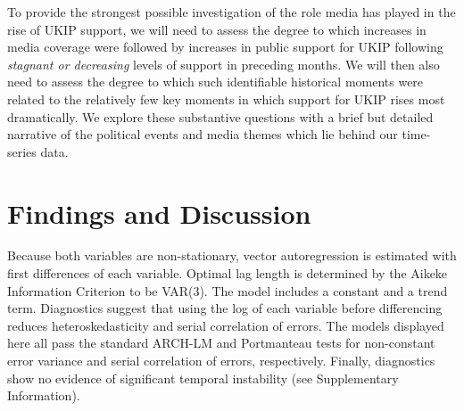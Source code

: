 \documentclass[12pt,article]{article}
\begin{document}
To provide the strongest possible investigation of the role media has
played in the rise of UKIP support, we will need to assess the degree to
which increases in media coverage were followed by increases in public
support for UKIP following \emph{stagnant or decreasing} levels of
support in preceding months. We will then also need to assess the degree
to which such identifiable historical moments were related to the
relatively few key moments in which support for UKIP rises most
dramatically. We explore these substantive questions with a brief but
detailed narrative of the political events and media themes which lie
behind our time-series data.

\section{Findings and Discussion}\label{findings-and-discussion}

Because both variables are non-stationary, vector autoregression is
estimated with first differences of each variable. Optimal lag length is
determined by the Aikeke Information Criterion to be VAR(3). The model
includes a constant and a trend term. Diagnostics suggest that using the
log of each variable before differencing reduces heteroskedasticity and
serial correlation of errors. The models displayed here all pass the
standard ARCH-LM and Portmanteau tests for non-constant error variance
and serial correlation of errors, respectively. Finally, diagnostics
show no evidence of significant temporal instability (see Supplementary
Information).
\end{document}
